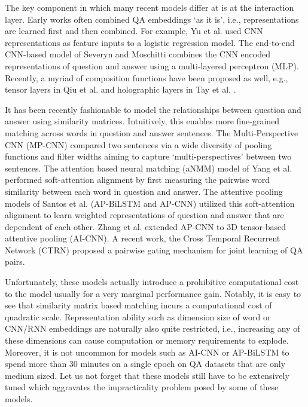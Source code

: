 \documentclass[sigconf]{acmart}
\begin{document}
The key component in which many recent models differ at is at the interaction layer. Early works often combined QA embeddings `as it is', i.e., representations are learned first and then combined. For example, Yu et al. \cite{DBLP:journals/corr/YuHBP14} used CNN representations as feature inputs to a logistic regression model. The end-to-end CNN-based model of Severyn and Moschitti \cite{DBLP:conf/sigir/SeverynM15} combines the CNN encoded representations of question and answer using a multi-layered perceptron (MLP). Recently, a myriad of composition functions have been proposed as well, e.g., tensor layers in Qiu et al. \cite{DBLP:conf/ijcai/QiuH15} and holographic layers in Tay et al. \cite{DBLP:conf/sigir/TayPLH17}. 

It has been recently fashionable to model the relationships between question and answer using similarity matrices. Intuitively, this enables more fine-grained matching across words in question and answer sentences. The Multi-Perspective CNN (MP-CNN) \cite{DBLP:conf/emnlp/HeGL15} compared two sentences via a wide diversity of pooling functions and filter widths aiming to capture `multi-perspectives' between two sentences. The attention based neural matching (aNMM) model of Yang et al. \cite{DBLP:conf/cikm/YangAGC16} performed soft-attention alignment by first measuring the pairwise word similarity between each word in question and answer. The attentive pooling models of Santos et al. \cite{DBLP:journals/corr/SantosTXZ16} (AP-BiLSTM and AP-CNN) utilized this soft-attention alignment to learn weighted representations of question and answer that are dependent of each other. Zhang et al. \cite{DBLP:conf/aaai/ZhangLSW17} extended AP-CNN to 3D tensor-based attentive pooling (AI-CNN). A recent work, the Cross Temporal Recurrent Network (CTRN) \cite{1711.07656} proposed a pairwise gating mechanism for joint learning of QA pairs. 

Unfortunately, these models actually introduce a prohibitive computational cost to the model usually for a very marginal performance gain. Notably, it is easy to see that similarity matrix based matching incurs a computational cost of quadratic scale. Representation ability such as dimension size of word or CNN/RNN embeddings are naturally also quite restricted, i.e., increasing any of these dimensions can cause computation or memory requirements to explode. Moreover, it is not uncommon for models such as AI-CNN or AP-BiLSTM to spend more than $30$ minutes on a single epoch on QA datasets that are only medium sized. Let us not forget that these models still have to be extensively tuned which aggravates the impracticality problem posed by some of these models. 
\end{document}
